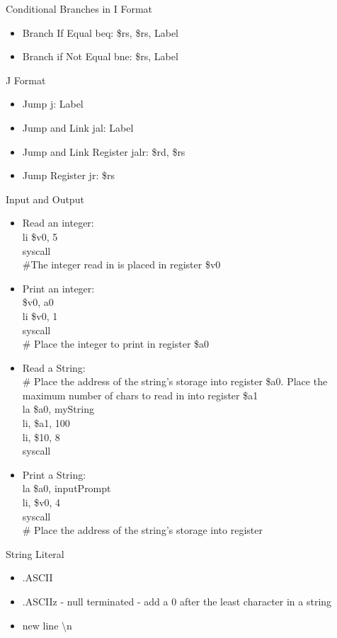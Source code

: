 \documentclass[12pt]{article}
\begin{document}
Conditional Branches in I Format \begin{itemize} 
\item Branch If Equal beq: \$rs, \$rs, Label
\item Branch if Not Equal bne: \$rs, Label

\end{itemize} 

J Format \begin{itemize} 
\item Jump j: Label
\item Jump and Link jal: Label
\item Jump and Link Register jalr: \$rd, \$rs
\item Jump Register jr: \$rs 
\end{itemize} 

Input and Output \begin{itemize} 
\item Read an integer: \\ li \$v0, 5 \\ syscall \\ \#The integer read in is placed in register \$v0
\item Print an integer: \\ \$v0, a0 \\ li \$v0, 1 \\ syscall \\ \# Place the integer to print in register \$a0
\item Read a String: \\ \# Place the address of the string's storage into register \$a0. Place the maximum number of chars to read in into register \$a1 \\ la \$a0, myString \\ li, \$a1, 100 \\ li, \$10, 8 \\ syscall
\item Print a String: \\ la \$a0, inputPrompt \\ li, \$v0, 4 \\ syscall \\ \# Place the address of the string's storage into register 
\end{itemize}

String Literal \begin{itemize} 
\item .ASCII 
\item .ASCIIz - null terminated - add a 0 after the least character in a string 
\item new line \textbackslash n  
\end{itemize}
\end{document}
